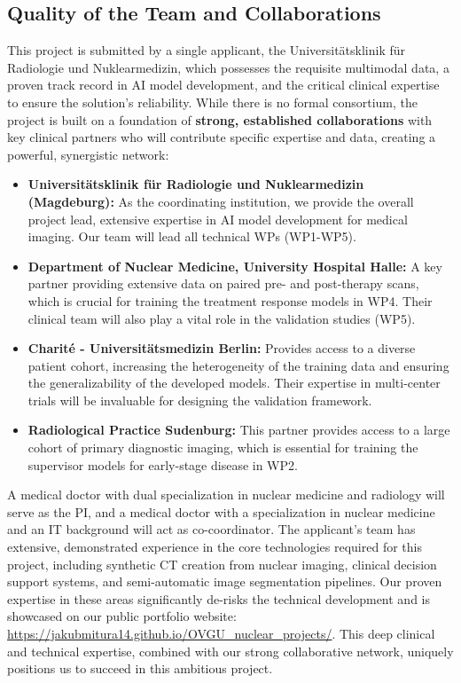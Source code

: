 \documentclass[11pt, a4paper]{article}
\begin{document}
\subsection{Quality of the Team and Collaborations}
This project is submitted by a single applicant, the Universitätsklinik für Radiologie und Nuklearmedizin, which possesses the requisite multimodal data, a proven track record in AI model development, and the critical clinical expertise to ensure the solution's reliability. While there is no formal consortium, the project is built on a foundation of \textbf{strong, established collaborations} with key clinical partners who will contribute specific expertise and data, creating a powerful, synergistic network:
\begin{itemize}
    \item \textbf{Universitätsklinik für Radiologie und Nuklearmedizin (Magdeburg):} As the coordinating institution, we provide the overall project lead, extensive expertise in AI model development for medical imaging. Our team will lead all technical WPs (WP1-WP5).
    \item \textbf{Department of Nuclear Medicine, University Hospital Halle:} A key partner providing extensive data on paired pre- and post-therapy scans, which is crucial for training the treatment response models in WP4. Their clinical team will also play a vital role in the validation studies (WP5).
    \item \textbf{Charité - Universitätsmedizin Berlin:} Provides access to a diverse patient cohort, increasing the heterogeneity of the training data and ensuring the generalizability of the developed models. Their expertise in multi-center trials will be invaluable for designing the validation framework.
    \item \textbf{Radiological Practice Sudenburg:} This partner provides access to a large cohort of primary diagnostic imaging, which is essential for training the supervisor models for early-stage disease in WP2.
\end{itemize}
A medical doctor with dual specialization in nuclear medicine and radiology will serve as the PI, and a medical doctor with a specialization in nuclear medicine and an IT background will act as co-coordinator. The applicant's team has extensive, demonstrated experience in the core technologies required for this project, including synthetic CT creation from nuclear imaging, clinical decision support systems, and semi-automatic image segmentation pipelines. Our proven expertise in these areas significantly de-risks the technical development and is showcased on our public portfolio website: \url{https://jakubmitura14.github.io/OVGU_nuclear_projects/}. This deep clinical and technical expertise, combined with our strong collaborative network, uniquely positions us to succeed in this ambitious project.
\end{document}
